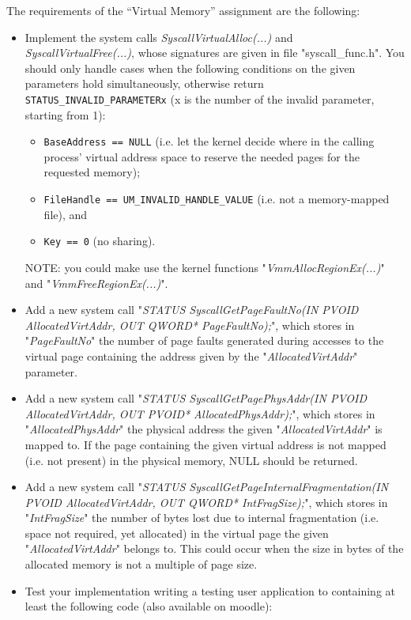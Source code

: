 The requirements of the ``Virtual Memory'' assignment are the following:
\begin{itemize}
    \item Implement the system calls \textit{SyscallVirtualAlloc(...)} and \textit{SyscallVirtualFree(...)}, whose signatures are given in file "syscall\_func.h". You should only handle cases when the following conditions on the given parameters hold simultaneously, otherwise return \texttt{STATUS\_INVALID\_PARAMETERx} (x is the number of the invalid parameter, starting from 1):
        \begin{itemize}
            \item  \texttt{BaseAddress == NULL} (i.e. let the kernel decide where in the calling process' virtual address space to reserve the needed pages for the requested memory);

            \item \texttt{FileHandle == UM\_INVALID\_HANDLE\_VALUE} (i.e. not a memory-mapped file), and

            \item \texttt{Key == 0} (no sharing).
        \end{itemize}
        NOTE: you could make use the kernel functions "\textit{VmmAllocRegionEx(...)}" and "\textit{VmmFreeRegionEx(...)}". 


        \item Add a new system call "\textit{STATUS SyscallGetPageFaultNo(IN PVOID AllocatedVirtAddr, OUT QWORD* PageFaultNo);}", which stores in "\textit{PageFaultNo}" the number of page faults generated during accesses to the virtual page containing the address given by the "\textit{AllocatedVirtAddr}" parameter. 

        \item Add a new system call "\textit{STATUS SyscallGetPagePhysAddr(IN PVOID AllocatedVirtAddr, OUT PVOID* AllocatedPhysAddr);}", which stores in "\textit{AllocatedPhysAddr}" the physical address the given "\textit{AllocatedVirtAddr}" is mapped to. If the page containing the given virtual address is not mapped (i.e. not present) in the physical memory, NULL should be returned.

        \item Add a new system call "\textit{STATUS SyscallGetPageInternalFragmentation(IN PVOID AllocatedVirtAddr, OUT QWORD* IntFragSize);}", which stores in "\textit{IntFragSize}" the number of bytes lost due to internal fragmentation (i.e. space not required, yet allocated) in the virtual page the given "\textit{AllocatedVirtAddr}" belongs to. This could occur when the size in bytes of the allocated memory is not a multiple of page size.

        \item Test your implementation writing a testing user application to containing at least the following code (also available on moodle):
\end{itemize}
